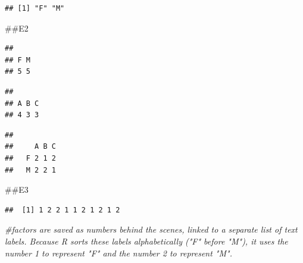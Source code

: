 \documentclass[
]{article}
\newenvironment{Shaded}{\begin{snugshade}}{\end{snugshade}}
\newcommand{\CommentTok}[1]{\textcolor[rgb]{0.56,0.35,0.01}{\textit{#1}}}
\newcommand{\FunctionTok}[1]{\textcolor[rgb]{0.13,0.29,0.53}{\textbf{#1}}}
\newcommand{\NormalTok}[1]{#1}
\newcommand{\SpecialCharTok}[1]{\textcolor[rgb]{0.81,0.36,0.00}{\textbf{#1}}}
\begin{document}
\begin{verbatim}
## [1] "F" "M"
\end{verbatim}

\#\#E2

\begin{Shaded}
\end{Shaded}

\begin{verbatim}
## 
## F M 
## 5 5
\end{verbatim}

\begin{Shaded}
\end{Shaded}

\begin{verbatim}
## 
## A B C 
## 4 3 3
\end{verbatim}

\begin{Shaded}
\end{Shaded}

\begin{verbatim}
##    
##     A B C
##   F 2 1 2
##   M 2 2 1
\end{verbatim}

\#\#E3

\begin{Shaded}
\end{Shaded}

\begin{verbatim}
##  [1] 1 2 2 1 1 2 1 2 1 2
\end{verbatim}

\begin{Shaded}
\begin{Highlighting}[]
\CommentTok{\#factors are saved as numbers behind the scenes, linked to a separate list of text labels. Because R sorts these labels alphabetically ("F" before "M"), it uses the number 1 to represent "F" and the number 2 to represent "M".}
\end{Highlighting}
\end{Shaded}
\end{document}
